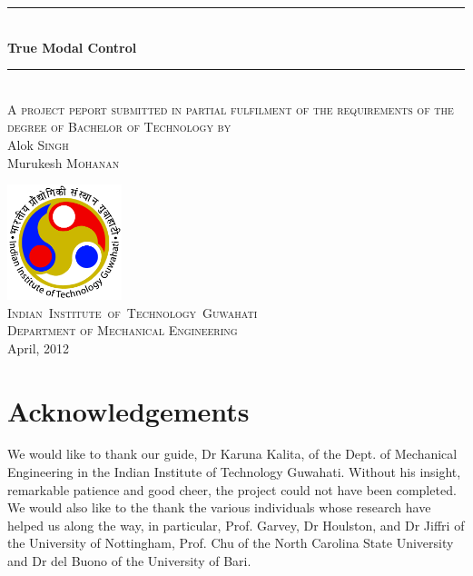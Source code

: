 \documentclass[a4paper,12pt]{report}
\newcommand{\HRule}{\rule{\linewidth}{0.5mm}}
\begin{document}
\begin{titlepage}
\begin{center}
\HRule \\[0.6cm] 
{ \LARGE \bfseries True Modal Control}\\[0.5cm]
\HRule \\[1.5cm]

\textsc{A project peport submitted in partial fulfilment of the requirements of the degree of Bachelor of Technology by}\\[1cm]

Alok \textsc{Singh} \\[0.3cm]
Murukesh \textsc{Mohanan} \\

\vfill

\includegraphics[width=0.25\textwidth]{iitg_logo}\\[1.2cm]
\textsc{\LARGE \mbox{Indian Institute of Technology Guwahati}}\\[0.7cm]
\textsc{\Large Department of Mechanical Engineering}\\[1.2cm]
{\large April, 2012}

\end{center}
\end{titlepage}


\chapter*{Acknowledgements}
We would like to thank our guide, Dr Karuna Kalita, of the Dept. of Mechanical 
Engineering in the Indian Institute of Technology Guwahati. Without his insight, 
remarkable patience and good cheer, the project could not have been completed. 
We would also like to the thank the various individuals whose research have 
helped us along the way, in particular, Prof. Garvey, Dr Houlston, and Dr Jiffri 
of the University of Nottingham, Prof. Chu of the North Carolina State University 
and Dr del Buono of the University of Bari.
\thispagestyle{empty}
\cleardoublepage
\setcounter{page}{1}
\tableofcontents
\listoffigures
\newpage
\printglossary[title={List of Symbols},toctitle={List of Symbols}]
\printglossary[type=\acronymtype] 
\newpage
\setcounter{page}{1}
\end{document}
